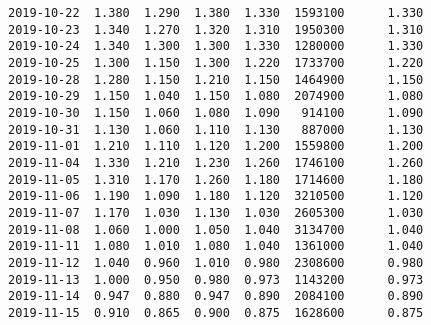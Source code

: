 \documentclass[11pt]{article}
\begin{document}
\begin{Verbatim}[commandchars=\\\{\}]
2019-10-22  1.380  1.290  1.380  1.330  1593100      1.330
2019-10-23  1.340  1.270  1.320  1.310  1950300      1.310
2019-10-24  1.340  1.300  1.300  1.330  1280000      1.330
2019-10-25  1.300  1.150  1.300  1.220  1733700      1.220
2019-10-28  1.280  1.150  1.210  1.150  1464900      1.150
2019-10-29  1.150  1.040  1.150  1.080  2074900      1.080
2019-10-30  1.150  1.060  1.080  1.090   914100      1.090
2019-10-31  1.130  1.060  1.110  1.130   887000      1.130
2019-11-01  1.210  1.110  1.120  1.200  1559800      1.200
2019-11-04  1.330  1.210  1.230  1.260  1746100      1.260
2019-11-05  1.310  1.170  1.260  1.180  1714600      1.180
2019-11-06  1.190  1.090  1.180  1.120  3210500      1.120
2019-11-07  1.170  1.030  1.130  1.030  2605300      1.030
2019-11-08  1.060  1.000  1.050  1.040  3134700      1.040
2019-11-11  1.080  1.010  1.080  1.040  1361000      1.040
2019-11-12  1.040  0.960  1.010  0.980  2308600      0.980
2019-11-13  1.000  0.950  0.980  0.973  1143200      0.973
2019-11-14  0.947  0.880  0.947  0.890  2084100      0.890
2019-11-15  0.910  0.865  0.900  0.875  1628600      0.875


\end{Verbatim}
\end{document}
